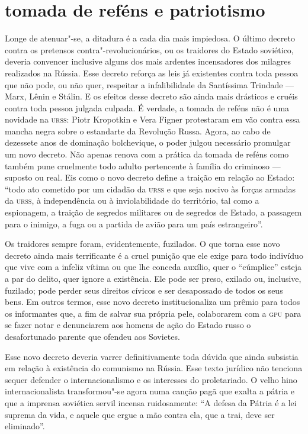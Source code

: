 \section*{tomada de reféns e patriotismo}
Longe de atenuar"-se, a ditadura é a cada dia mais impiedosa. O último
decreto contra os pretensos contra"-revolucionários, ou os traidores
do Estado soviético, deveria convencer inclusive alguns dos mais
ardentes incensadores dos milagres realizados na Rússia. Esse decreto
reforça as leis já existentes contra toda pessoa que não pode, ou não
quer, respeitar a infalibilidade da Santíssima Trindade --- Marx, Lênin e
Stálin. E os efeitos desse decreto são ainda mais drásticos e cruéis
contra toda pessoa julgada culpada. É verdade, a tomada de reféns não
é uma novidade na \textsc{urss}: Piotr Kropotkin e Vera Figner protestaram em
vão contra essa mancha negra sobre o estandarte da Revolução Russa.
Agora, ao cabo de dezessete anos de dominação bolchevique, o poder
julgou necessário promulgar um novo decreto. Não apenas renova com a
prática da tomada de reféns como também pune cruelmente todo adulto
pertencente à família do criminoso --- suposto ou real. Eis como o novo
decreto define a traição em relação ao Estado: “todo ato cometido por
um cidadão da \textsc{urss} e que seja nocivo às forças armadas da \textsc{urss},
à independência ou à inviolabilidade do território, tal como a
espionagem, a traição de segredos militares ou de segredos de Estado, a
passagem para o inimigo, a fuga ou a partida de avião para um país
estrangeiro”.

Os traidores sempre foram, evidentemente, fuzilados. O que torna esse
novo decreto ainda mais terrificante é a cruel punição que ele exige
para todo indivíduo que vive com a infeliz vítima ou que lhe conceda
auxílio, quer o “cúmplice” esteja a par do delito, quer ignore a
existência. Ele pode ser preso, exilado ou, inclusive, fuzilado;
pode perder seus direitos cívicos e ser desapossado de todos os seus bens.
Em outros termos, esse novo decreto institucionaliza um prêmio para
todos os informantes que, a fim de salvar sua própria pele, colaborarem
com a \textsc{gpu} para se fazer notar e denunciarem aos homens de ação do Estado 
russo o desafortunado parente que ofendeu aos Sovietes.

Esse novo decreto deveria varrer definitivamente toda dúvida que ainda subsistia
em relação à existência do comunismo na Rússia. Esse texto
jurídico não tenciona sequer defender o internacionalismo e os
interesses do proletariado. O velho hino internacionalista
transformou"-se agora numa canção pagã que exalta a pátria e que a
imprensa soviética servil incensa ruidosamente: “A defesa da Pátria é a
lei suprema da vida, e aquele que ergue a mão contra ela, que a trai,
deve ser eliminado”.


